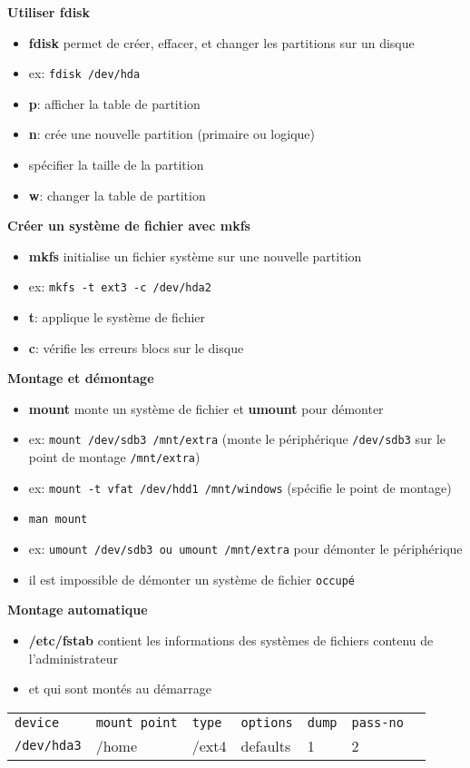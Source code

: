 \documentclass[french]{beamer}
\begin{document}
\begin{frame}
\textbf{Utiliser fdisk}
\begin{itemize}
\item \textbf{fdisk} permet de créer, effacer, et changer les partitions sur
un disque
\item ex: \texttt{fdisk /dev/hda}
\item \textbf{p}: afficher la table de partition
\item \textbf{n}: crée une nouvelle partition (primaire ou logique)
\item spécifier la taille de la partition
\item \textbf{w}: changer la table de partition
\end{itemize}
\end{frame}

\begin{frame}
\textbf{Créer un système de fichier avec mkfs}
\begin{itemize}
\item \textbf{mkfs} initialise un fichier système sur une nouvelle partition
\item ex: \texttt{mkfs -t ext3 -c /dev/hda2}
\item \textbf{t}: applique le système de fichier
\item \textbf{c}: vérifie les erreurs blocs sur le disque
\end{itemize}
\end{frame}

\begin{frame}
\textbf{Montage et démontage}
\begin{itemize}
\item \textbf{mount} monte un système de fichier et \textbf{umount} pour démonter
\item ex: \texttt{mount /dev/sdb3 /mnt/extra} (monte le périphérique
\texttt{/dev/sdb3} sur le point de montage \texttt{/mnt/extra})
\item ex: \texttt{mount -t vfat /dev/hdd1 /mnt/windows} (spécifie le point de
montage)
\item \texttt{man mount}
\item ex: \texttt{umount /dev/sdb3 ou umount /mnt/extra} pour démonter le périphérique
\item il est impossible de démonter un système de fichier \texttt{occupé}
\end{itemize}
\end{frame}

\begin{frame}
\textbf{Montage automatique}
\begin{itemize}
\item \textbf{/etc/fstab} contient les informations des systèmes de fichiers
contenu de l'administrateur
\item et qui sont montés au démarrage
\end{itemize}
\begin{tabular}{l l l l l l l}
\texttt{device} & \texttt{mount point} & \texttt{type} &
\texttt{options} & \texttt{dump} & \texttt{pass-no}\\
\texttt{/dev/hda3} & /home & /ext4 & defaults & 1 & 2
\end{tabular}
\end{frame}
\end{document}
